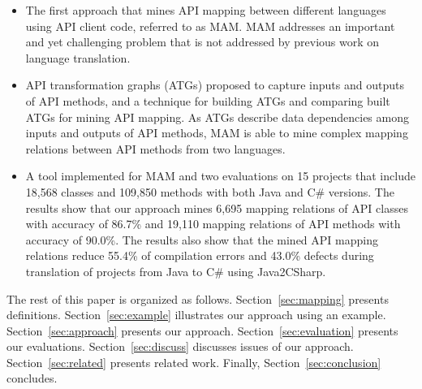 \begin{itemize}\vspace*{-1.5ex}
\item The first approach that mines API mapping between
different languages using API client code, referred to as MAM. MAM
addresses an important and yet challenging problem that is not
addressed by previous work on language translation.\vspace*{-1.5ex}
\item API transformation graphs (ATGs) proposed to capture inputs
and outputs of API methods, and a technique for building ATGs and
comparing built ATGs for mining API mapping. As ATGs describe data
dependencies among inputs and outputs of API methods, MAM is able to
mine complex mapping relations between API methods from two
languages.\vspace*{-1.5ex}
\item A tool implemented for MAM and two
evaluations on 15 projects that include 18,568 classes and 109,850
methods with both Java and C\# versions. The results show that our
approach mines 6,695 mapping relations of API classes with accuracy
of 86.7\% and 19,110 mapping relations of API methods with accuracy
of 90.0\%. The results also show that the mined API mapping
relations reduce 55.4\% of compilation errors and 43.0\% defects
during translation of projects from Java to C\# using Java2CSharp.
\end{itemize}\vspace*{-1.5ex}

The rest of this paper is organized as follows.
Section~\ref{sec:mapping} presents definitions.
Section~\ref{sec:example} illustrates our approach using an example.
Section~\ref{sec:approach} presents our approach.
Section~\ref{sec:evaluation} presents our evaluations.
Section~\ref{sec:discuss} discusses issues of our approach.
Section~\ref{sec:related} presents related work.
Finally, Section~\ref{sec:conclusion} concludes.
